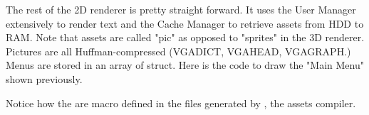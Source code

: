 \par
The rest of the 2D renderer is pretty straight forward. It uses the User Manager extensively to render text and the Cache Manager to retrieve assets from HDD to RAM. Note that assets are called "pic" as opposed to "sprites" in the 3D renderer. Pictures are all Huffman-compressed (VGADICT, VGAHEAD, VGAGRAPH.) Menus are stored in an array of struct. Here is the code to draw the "Main Menu" shown previously.\\

\par
\begin{minipage}{\textwidth}

\end{minipage}

\par
\begin{minipage}{\textwidth}

\end{minipage}
\par
Notice how the  are macro defined in the files generated by , the assets compiler.

